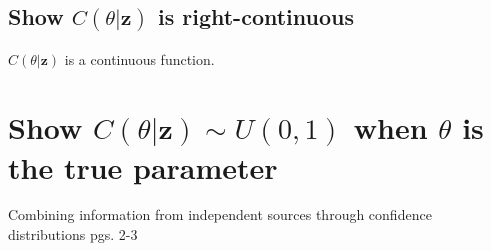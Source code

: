 \documentclass{article}
\begin{document}
\subsection{Show $C(\theta|\textbf{z})$ is right-continuous}
$C(\theta|\textbf{z})$ is a continuous function. 

\section{Show $C(\theta|\textbf{z}) \sim U(0, 1)$ when $\theta$ is the true parameter}
Combining information from independent sources through confidence distributions
pgs. 2-3
\end{document}

